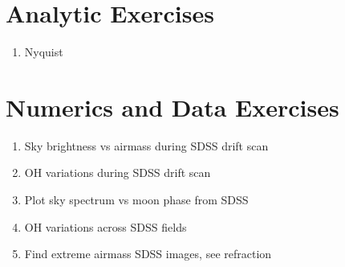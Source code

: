 \section{Analytic Exercises}

\begin{enumerate}
\item Nyquist
\end{enumerate}

\section{Numerics and Data Exercises}

\begin{enumerate}
\item Sky brightness vs airmass during SDSS drift scan
\item OH variations during SDSS drift scan
\item Plot sky spectrum vs moon phase from SDSS
\item OH variations across SDSS fields
\item Find extreme airmass SDSS images, see refraction
\end{enumerate}


  
